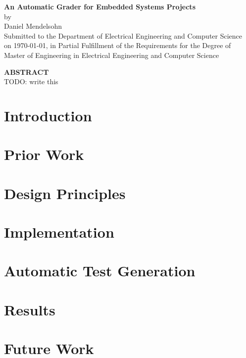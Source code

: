 \documentclass[12pt]{article}
\newcommand{\mytitle}{\textbf{An Automatic Grader for Embedded Systems Projects}}
\newcommand{\mydate}{\today}
\begin{document}
\addtocounter{page}{1}

\newpage
\mbox{}
\newpage

\begin{center}
\mytitle \\
by \\
Daniel Mendelsohn \\
\vspace{12pt}
Submitted to the Department of Electrical Engineering and Computer Science\\
 on \mydate{}, in Partial Fulfillment of the Requirements for the Degree of\\
 Master of Engineering in Electrical Engineering and Computer Science
\end{center}
\vspace{12pt}
\textbf{ABSTRACT} \\

\noindent TODO: write this

\newpage
\mbox{}
\newpage

\tableofcontents

\newpage
\section{Introduction}

\newpage
\section{Prior Work}

\newpage
\section{Design Principles}

\newpage
\section{Implementation}

\newpage
\section{Automatic Test Generation}

\newpage
\section{Results}

\newpage
\section{Future Work}
\end{document}
